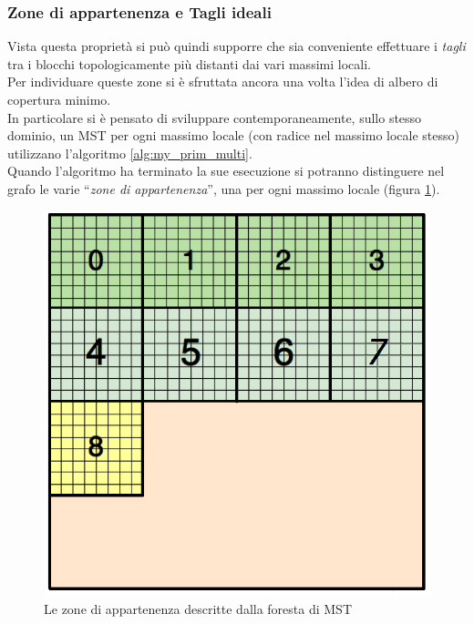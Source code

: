 {\subsubsection{Zone di appartenenza e Tagli ideali}\label{subsubsec:zone_app}
Vista questa proprietà si può quindi supporre che sia conveniente effettuare i \textit{tagli} tra i blocchi topologicamente più distanti dai vari massimi locali.\\
Per individuare queste zone si è sfruttata ancora una volta l'idea di albero di copertura minimo.\\
In particolare si è pensato di sviluppare contemporaneamente, sullo stesso dominio, un MST per ogni massimo locale (con radice nel massimo locale stesso) utilizzano l'algoritmo \ref{alg:my_prim_multi}.\\
Quando l'algoritmo ha terminato la sue esecuzione si potranno distinguere nel grafo le varie \textquotedblleft \emph{zone di appartenenza}\textquotedblright, una per ogni massimo locale (figura \ref{fig:mst_local_max}).
\begin{figure}[H]
	\centering
	\includegraphics[width=1.0\textwidth]{immagini/block_on_grid.png}
	\caption{Le zone di appartenenza descritte dalla foresta di MST}
	\label{fig:mst_local_max}
\end{figure}

}
